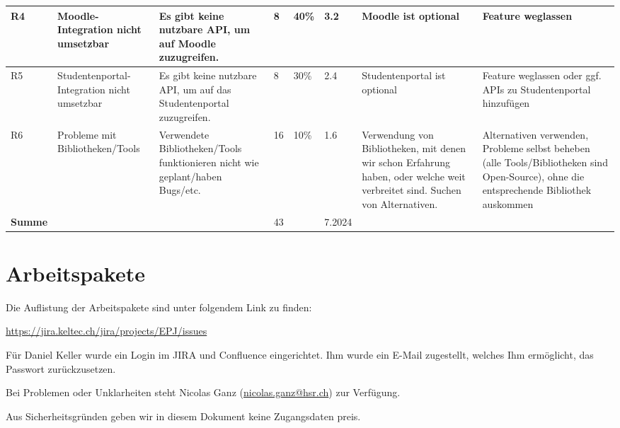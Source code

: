 \documentclass[a4paper]{article}
\let\oldsection\section
\renewcommand\section{\clearpage\oldsection}
\def\jiraurl{https://jira.keltec.ch/jira}
\begin{document}
\begin{landscape}
\begin{tabulary}{\linewidth}{lLLlLLLL}
    R4 & 
    Moodle-Integration nicht umsetzbar & 
    Es gibt keine nutzbare API, um auf Moodle zuzugreifen. & 
    8 & 
    40\% & 
    3.2 & 
    Moodle ist optional & 
    Feature weglassen \\ \hline

    R5 & 
    Studenten\-portal-Integration nicht umsetzbar & 
    Es gibt keine nutzbare API, um auf das Studentenportal zuzugreifen. & 
    8 & 
    30\% & 
    2.4 & 
    Studentenportal ist optional & 
    Feature weglassen oder ggf. APIs zu Studentenportal hinzufügen \\  \hline

    R6 &
    Probleme mit Bibliotheken/Tools &
    Verwendete Bibliotheken/Tools funktionieren nicht wie geplant/haben Bugs/etc. &
    16 &
    10\% &
    1.6 &
    Verwendung von Bibliotheken, mit denen wir schon Erfahrung haben, oder welche weit verbreitet sind. Suchen von Alternativen. &
    Alternativen verwenden, Probleme selbst beheben (alle Tools/Bibliotheken sind Open-Source), ohne die entsprechende Bibliothek auskommen \\ \midrule

    \textbf{Summe} & & & 43 & & 7.2024 & & \\
    \bottomrule
  \end{tabulary}
\end{landscape}
\restoregeometry

\section{Arbeitspakete}

Die Auflistung der Arbeitspakete sind unter folgendem Link zu finden:

\url{\jiraurl/projects/EPJ/issues}

Für Daniel Keller wurde ein Login im JIRA und Confluence eingerichtet.
Ihm wurde ein E-Mail zugestellt, welches Ihm ermöglicht, das Passwort zurückzusetzen.

Bei Problemen oder Unklarheiten steht Nicolas Ganz (\url{nicolas.ganz@hsr.ch}) zur Verfügung.

Aus Sicherheitsgründen geben wir in diesem Dokument keine Zugangsdaten preis.
\end{document}
